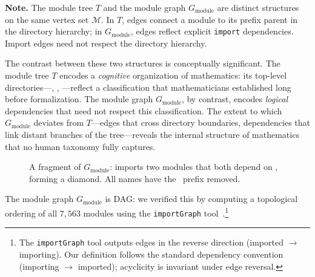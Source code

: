 \noindent\textbf{Note.}
The module tree $T$ and the module graph $G_{\mathrm{module}}$ are distinct structures on the same vertex set $\mathcal{M}$. In $T$, edges connect a module to its prefix parent in the directory hierarchy; in $G_{\mathrm{module}}$, edges reflect explicit \texttt{import} dependencies. Import edges need not respect the directory hierarchy.

The contrast between these two structures is conceptually significant. The module tree $T$ encodes a \emph{cognitive} organization of mathematics: its top-level directories---, , ---reflect a classification that mathematicians established long before formalization. The module graph $G_{\mathrm{module}}$, by contrast, encodes \emph{logical} dependencies that need not respect this classification. The extent to which $G_{\mathrm{module}}$ deviates from $T$---edges that cross directory boundaries, dependencies that link distant branches of the tree---reveals the internal structure of mathematics that no human taxonomy fully captures.

\begin{figure}[ht]
\centering
{}
\caption{A fragment of $G_{\mathrm{module}}$:  imports two modules that both depend on , forming a diamond. All names have the \ prefix removed.}
\label{fig:import-subgraph}
\end{figure}

The module graph $G_{\mathrm{module}}$ is DAG: we verified this by computing a topological ordering of all $7{,}563$ modules using the \texttt{importGraph} tool~\cite{importgraph}.\footnote{The \texttt{importGraph} tool outputs edges in the reverse direction (imported $\to$ importing). Our definition follows the standard dependency convention (importing $\to$ imported); acyclicity is invariant under edge reversal.} 

